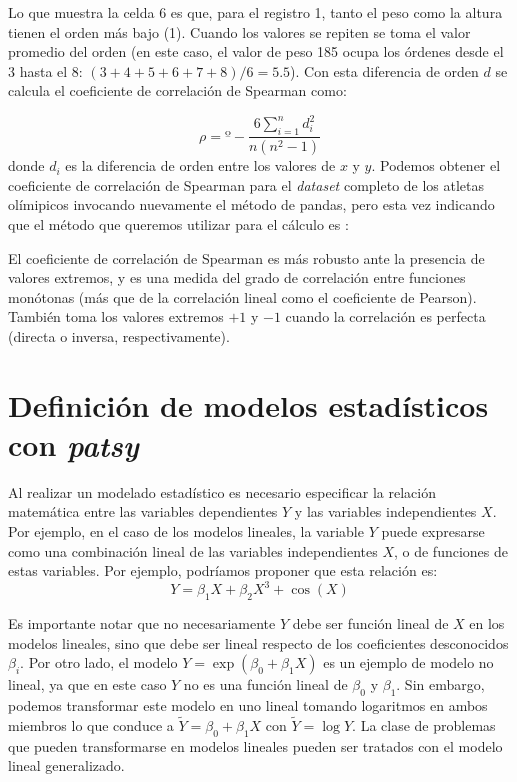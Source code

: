 
Lo que muestra la celda 6 es que, para el registro 1, tanto el peso como la altura tienen el orden más bajo (1). Cuando los valores se repiten se toma el valor promedio del orden (en este caso, el valor de peso 185 ocupa los órdenes desde el 3 hasta el 8:  $(3+4+5+6+7+8)/6=5.5$). Con esta diferencia de orden $d$ se calcula el coeficiente de correlación de Spearman como:

\[ \rho = º - \frac{6 \sum\limits_{i=1}^n d_i^2}{n(n^2-1)}  \]
donde $d_i$ es la diferencia de orden entre los valores de $x$ y $y$. Podemos obtener el coeficiente de correlación de Spearman para el \textit{dataset} completo de los atletas olímipicos invocando nuevamente el método  de pandas, pero esta vez indicando que el método que queremos utilizar para el cálculo es :


El coeficiente de correlación de Spearman es más robusto ante la presencia de valores extremos, y es una medida del grado de correlación entre funciones monótonas (más que de la correlación lineal como el coeficiente de Pearson). También toma los valores extremos $+1$ y $-1$ cuando la correlación es perfecta (directa o inversa, respectivamente).


\section{Definición de modelos estadísticos con \textit{patsy}}

Al realizar un modelado estadístico es necesario especificar la relación matemática entre las variables dependientes $Y$ y las variables independientes $X$. Por ejemplo, en el caso de los modelos lineales, la variable $Y$ puede expresarse como una combinación lineal de las variables independientes $X$, o de funciones de estas variables. Por ejemplo, podríamos proponer que esta relación es:
\[ Y = \beta_1 X + \beta_2 X^3 + \cos(X)  \]

Es importante notar que no necesariamente $Y$ debe ser función lineal de $X$ en los modelos lineales, sino que debe ser lineal respecto de los coeficientes desconocidos $\beta_i$. Por otro lado, el modelo $Y = \exp(\beta_0 + \beta_1 X)$ es un ejemplo de modelo no lineal, ya que en este caso $Y$ no es una función lineal de $\beta_0$ y $\beta_1$. Sin embargo, podemos transformar este modelo en uno lineal tomando logaritmos en ambos miembros lo que conduce a $\widetilde{Y} = \beta_0 + \beta_1 X$ con $\widetilde{Y} = \log{Y}$. La clase de problemas que pueden transformarse en modelos lineales pueden ser tratados con el modelo lineal generalizado.

